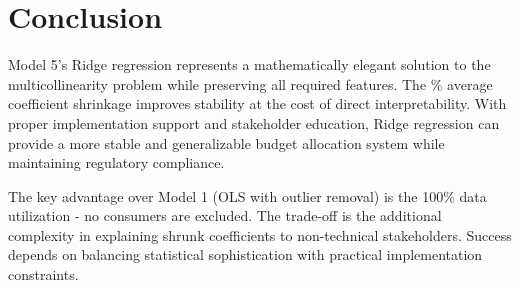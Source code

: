 \section{Conclusion}

Model 5's Ridge regression represents a mathematically elegant solution to the multicollinearity problem while preserving all required features. The \ModelFiveShrinkageFactor{}\% average coefficient shrinkage improves stability at the cost of direct interpretability. With proper implementation support and stakeholder education, Ridge regression can provide a more stable and generalizable budget allocation system while maintaining regulatory compliance.

The key advantage over Model 1 (OLS with outlier removal) is the 100\% data utilization - no consumers are excluded. The trade-off is the additional complexity in explaining shrunk coefficients to non-technical stakeholders. Success depends on balancing statistical sophistication with practical implementation constraints.